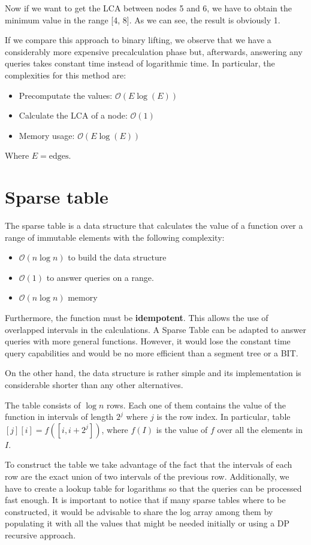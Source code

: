 \documentclass[12pt]{report}
\newcommand{\tbf}[1]{\textbf{\boldmath #1}}
\begin{document}
Now if we want to get the LCA between nodes 5 and 6, we have to obtain the minimum
value in the range [4, 8]. As we can see, the result is obviously 1.

If we compare this approach to binary lifting, we observe that we have a considerably
more expensive precalculation phase but, afterwards, answering any queries takes
constant time instead of logarithmic time. In particular, the complexities for this 
method are:
\begin{itemize}
		\setlength{\itemsep}{1pt}
		\item Precomputate the values: $\mathcal{O}(E\log(E))$
		\item Calculate the LCA of a node: $\mathcal{O}(1)$
		\item Memory usage: $\mathcal{O}(E\log(E))$
\end{itemize}
Where $E=\text{edges}$.

\newpage


\section{Sparse table}
The sparse table is a data structure that calculates the value of 
a function over a range of immutable elements with the following complexity:
\begin{itemize}
		\setlength{\itemsep}{2 pt}
		\item \tbf{$\mathcal O(n\log n)$} to build the data structure
		\item \tbf{$\mathcal O(1)$} to answer queries on a range. 
		\item \tbf{$\mathcal O(n\log n)$} memory
\end{itemize}
Furthermore, the function must be \textbf{idempotent}. This allows the use of
overlapped intervals in the calculations. A Sparse Table can be adapted to 
answer queries with more general functions. However, it would lose the constant
time query capabilities and would be no more efficient than a segment tree or a BIT.


On the other hand, the data structure is rather simple and its implementation 
is considerable shorter than any other alternatives. 

The table consists of $\log n$ rows. Each one of them contains the value of the
function in intervals of length $2^j$ where $j$ is the row index. In particular,
table$[j][i]=f([i,i+2^j])$, where $f(I)$ is the value of $f$ over all the 
elements in $I$.

To construct the table we take advantage of the fact that the intervals of each
row are the exact union of two intervals of the previous row. Additionally, we 
have to create a lookup table for logarithms so that the queries can be 
processed fast enough.
It is important to notice that if many sparse tables where to be constructed,
it would be advisable to share the log array among them by populating it with
all the values that might be needed initially or using a DP recursive approach.
\end{document}
